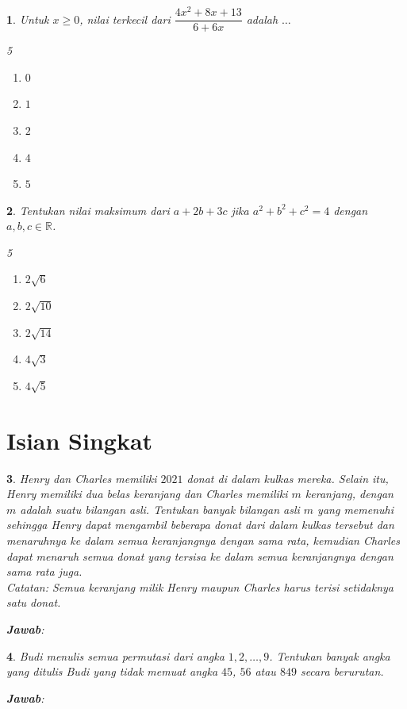 \documentclass[11pt,a4paper,DIV=12]{scrartcl}
\newcommand\answerbox{%
\vspace*{0.5cm}%
\noindent\textbf{\textsf{Jawab}}: \fbox{\rule{14cm}{0pt}\rule[-0.2ex]{0pt}{1.9ex}}}
\theoremstyle{problemstyle}
\newtheorem{problem}{}
\theoremstyle{answerstyle}
\newenvironment{choices}[1][5]{%
\raggedcolumns
  \begin{multicols}{#1}%
  \begin{enumerate}[label=(\Alph*)]%
}{%
  \end{enumerate}%
  \end{multicols}%
}
\begin{document}
\begin{problem}
  Untuk $x\geq 0$, nilai terkecil dari $\dfrac{4x^2+8x+13}{6+6x}$ adalah $\ldots$

  \begin{choices}
    \item $0$
    \item $1$
    \item $2$
    \item $4$
    \item $5$
  \end{choices}
\end{problem}

\begin{problem}
  Tentukan nilai maksimum dari $a+2b+3c$ jika $a^2+b^2+c^2=4$ dengan $a,b,c\in\mathbb{R}$.

  \begin{choices}
    \item $2\sqrt{6}$
    \item $2\sqrt{10}$
    \item $2\sqrt{14}$
    \item $4\sqrt{3}$
    \item $4\sqrt{5}$
  \end{choices}
\end{problem}

\section*{Isian Singkat}
\begin{problem}
  Henry dan Charles memiliki $2021$ donat di dalam kulkas mereka. Selain itu, Henry memiliki dua belas keranjang dan Charles memiliki $m$ keranjang, dengan $m$ adalah suatu bilangan asli. Tentukan banyak bilangan asli $m$ yang memenuhi sehingga Henry dapat mengambil beberapa donat dari dalam kulkas tersebut dan menaruhnya ke dalam semua keranjangnya dengan sama rata, kemudian Charles dapat menaruh semua donat yang tersisa ke dalam semua keranjangnya dengan sama rata juga.\\
  \textit{Catatan: Semua keranjang milik Henry maupun Charles harus terisi setidaknya satu donat.}

  \answerbox
\end{problem}

\begin{problem}
  Budi menulis semua permutasi dari angka $1,2,\dots,9$. Tentukan banyak angka yang ditulis Budi yang tidak memuat angka $45$, $56$ atau $849$ secara berurutan.

  \answerbox
\end{problem}
\end{document}
